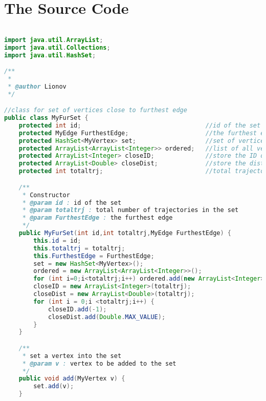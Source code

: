 \chapter{The Source Code}
\label{app:C}

\singlespacing 
%
%
\begin{lstlisting}[language=Java,basicstyle=\tiny,caption=MyFurSet.java]

import java.util.ArrayList;
import java.util.Collections;
import java.util.HashSet;

/**
 *
 * @author Lionov
 */

//class for set of vertices close to furthest edge
public class MyFurSet {
    protected int id;                                  //id of the set
    protected MyEdge FurthestEdge;                     //the furthest edge
    protected HashSet<MyVertex> set;                   //set of vertices close to furthest edge
    protected ArrayList<ArrayList<Integer>> ordered;   //list of all vertices in the set for each trajectory
    protected ArrayList<Integer> closeID;              //store the ID of all vertices
    protected ArrayList<Double> closeDist;             //store the distance of all vertices
    protected int totaltrj;                            //total trajectories in the set

    /**
     * Constructor
     * @param id : id of the set
     * @param totaltrj : total number of trajectories in the set
     * @param FurthestEdge : the furthest edge
     */
    public MyFurSet(int id,int totaltrj,MyEdge FurthestEdge) {
        this.id = id;
        this.totaltrj = totaltrj;
        this.FurthestEdge = FurthestEdge;
        set = new HashSet<MyVertex>();
        ordered = new ArrayList<ArrayList<Integer>>();
        for (int i=0;i<totaltrj;i++) ordered.add(new ArrayList<Integer>());
        closeID = new ArrayList<Integer>(totaltrj);
        closeDist = new ArrayList<Double>(totaltrj);
        for (int i = 0;i <totaltrj;i++) {
            closeID.add(-1);
            closeDist.add(Double.MAX_VALUE);
        }
    }

    /**
     * set a vertex into the set
     * @param v : vertex to be added to the set
     */
    public void add(MyVertex v) {
        set.add(v);
    }


\end{lstlisting}
